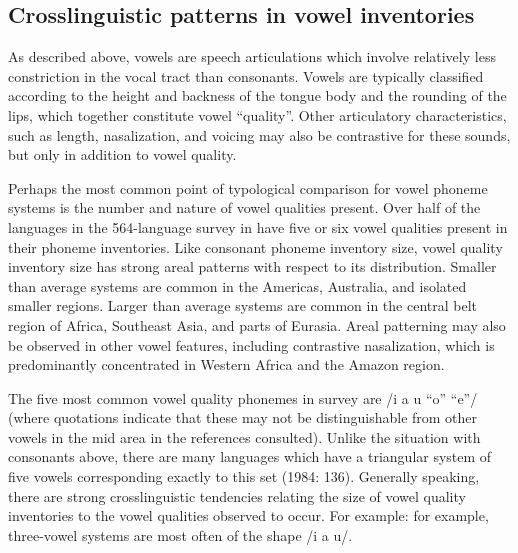 \subsection{Crosslinguistic patterns in vowel inventories}\label{sec:4.1.2}

  As described above, vowels are speech articulations which involve relatively less constriction in the vocal tract than consonants. Vowels are typically classified according to the height and backness of the tongue body and the rounding of the lips, which together constitute vowel ``quality''. Other articulatory characteristics, such as length, nasalization, and voicing may also be contrastive for these sounds, but only in addition to vowel quality.

 \hspace*{-0.19002pt}Perhaps the most common point of typological comparison for vowel phoneme systems is the number and nature of vowel qualities present. Over half of the languages in the 564-language survey in \citet{Maddieson2013c} have five or six vowel qualities present in their phoneme inventories. Like consonant phoneme inventory size, vowel quality inventory size has strong areal patterns with respect to its distribution. Smaller than average systems are common in the Americas, Australia, and isolated smaller regions. Larger than average systems are common in the central belt region of Africa, Southeast Asia, and parts of Eurasia. Areal patterning may also be observed in other vowel features, including contrastive nasalization, which is predominantly concentrated in Western Africa and the Amazon region.

  The five most common vowel quality phonemes in  survey are /i a u “o” “e”/ (where quotations indicate that these may not be distinguishable from other vowels in the mid area in the references consulted). Unlike the situation with consonants above, there are many languages which have a triangular system of five vowels corresponding exactly to this set (1984: 136). Generally speaking, there are strong crosslinguistic tendencies relating the size of vowel quality inventories to the vowel qualities observed to occur. For example: for example, three-vowel systems are most often of the shape /i a u/. 

